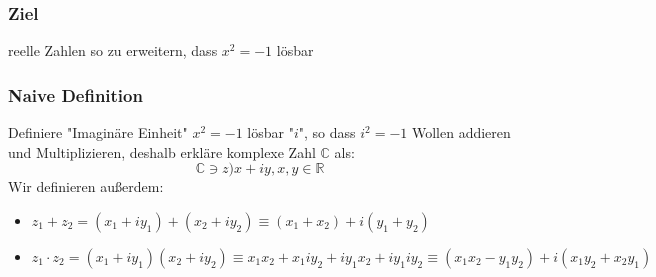 \documentclass[a4paper]{scrartcl}
\theoremstyle{definition}
\theoremstyle{plain}
\theoremstyle{remark}
\theoremstyle{remark}
\newcommand{\I}{\ensuremath{i}}%
\begin{document}
\subsubsection{Ziel}
\label{sec-5-1-1}
reelle Zahlen so zu erweitern, dass $x^2 = - 1$ lösbar
\subsubsection{Naive Definition}
\label{sec-5-1-2}
Definiere "Imaginäre Einheit" $x^2 = -1$ lösbar "$\I$", so dass $\I^2 = -1$
Wollen addieren und Multiplizieren, deshalb erkläre komplexe Zahl $\mathbb{C}$ als:
\[\mathbb{C} \ni z ) x + \I y, x,y\in\mathbb{R}\]
Wir definieren außerdem:
\begin{itemize}
\item $z_1 + z_2 = (x_1 + \I y_1) + (x_2 + \I y_2) \equiv (x_1 + x_2) + \I(y_1 + y_2)$
\item $z_1 \cdot z_2 = (x_1 + \I y_1) (x_2 + \I y_2) \equiv x_1 x_2 + x_1 \I y_2 + \I y_1 x_2 + \I y_1 \I y_2 \equiv (x_1 x_2 - y_1 y_2) + i(x_1 y_2 + x_2 y_1)$
\end{itemize}
\end{document}
